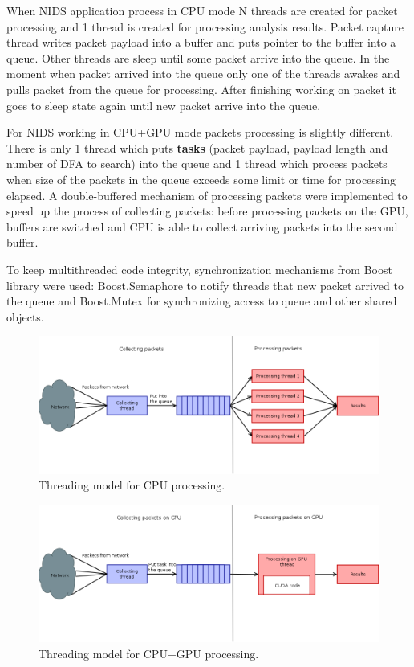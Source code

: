 \documentclass[thesis=M,english]{FITthesis}[2011/07/15]
\begin{document}
When NIDS application process in CPU mode N threads are created for packet processing and 1 thread is created for processing analysis results. Packet capture thread writes packet payload into a buffer and puts pointer to the buffer into a queue. Other threads are sleep until some packet arrive into the queue. In the moment when packet arrived into the queue only one of the threads awakes and pulls packet from the queue for processing. After finishing working on packet it goes to sleep state again until new packet arrive into the queue.

For NIDS working in CPU+GPU mode packets processing is slightly different. There is only 1 thread which puts \textbf{tasks} (packet payload, payload length and number of DFA to search) into the queue and 1 thread which process packets when size of the packets in the queue exceeds some limit or time for processing elapsed. A double-buffered mechanism of processing packets were implemented to speed up the process of collecting packets: before processing packets on the GPU, buffers are switched and CPU is able to collect arriving packets into the second buffer.

To keep multithreaded code integrity, synchronization mechanisms from Boost library were used: Boost.Semaphore to notify threads that new packet arrived to the queue and Boost.Mutex for synchronizing access to queue and other shared objects.

\begin{figure}[h]
\centering
\includegraphics[scale=0.3]{images/cpu_threads.png}
\caption{Threading model for CPU processing.}
\label{fig:cpu_threads}
\end{figure}

\begin{figure}[h]
\centering
\includegraphics[scale=0.3]{images/gpu_threads.png}
\caption{Threading model for CPU+GPU processing.}
\label{fig:gpu_threads}
\end{figure}
\end{document}
